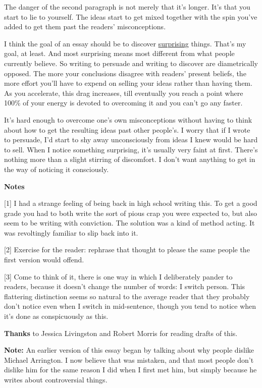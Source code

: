 The danger of the second paragraph is not merely that it's longer. It's
that you start to lie to yourself. The ideas start to get mixed together
with the spin you've added to get them past the readers' misconceptions.

I think the goal of an essay should be to discover
\href{essay.html}{surprising} things. That's my goal, at least. And most
surprising means most different from what people currently believe. So
writing to persuade and writing to discover are diametrically opposed.
The more your conclusions disagree with readers' present beliefs, the
more effort you'll have to expend on selling your ideas rather than
having them. As you accelerate, this drag increases, till eventually you
reach a point where 100\% of your energy is devoted to overcoming it and
you can't go any faster.

It's hard enough to overcome one's own misconceptions without having to
think about how to get the resulting ideas past other people's. I worry
that if I wrote to persuade, I'd start to shy away unconsciously from
ideas I knew would be hard to sell. When I notice something surprising,
it's usually very faint at first. There's nothing more than a slight
stirring of discomfort. I don't want anything to get in the way of
noticing it consciously.

\textbf{Notes}

{[}1{]} I had a strange feeling of being back in high school writing
this. To get a good grade you had to both write the sort of pious crap
you were expected to, but also seem to be writing with conviction. The
solution was a kind of method acting. It was revoltingly familiar to
slip back into it.

{[}2{]} Exercise for the reader: rephrase that thought to please the
same people the first version would offend.

{[}3{]} Come to think of it, there is one way in which I deliberately
pander to readers, because it doesn't change the number of words: I
switch person. This flattering distinction seems so natural to the
average reader that they probably don't notice even when I switch in
mid-sentence, though you tend to notice when it's done as conspicuously
as this.

\textbf{Thanks} to Jessica Livingston and Robert Morris for reading
drafts of this.

\textbf{Note:} An earlier version of this essay began by talking about
why people dislike Michael Arrington. I now believe that was mistaken,
and that most people don't dislike him for the same reason I did when I
first met him, but simply because he writes about controversial things.
